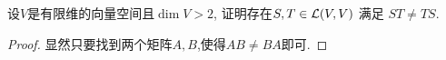 \begin{problem}{14}
  设$V$是有限维的向量空间且$\dim V > 2 $, 
  证明存在$S,T\in\mathcal{L}(V,V)$ 满足 $ST\neq TS$.
\end{problem}

\begin{proof}
  显然只要找到两个矩阵$A,B$,使得$AB\neq BA$即可.
\end{proof}
